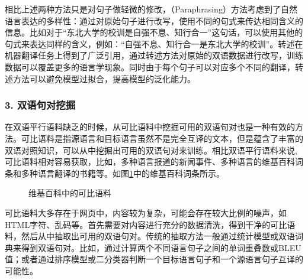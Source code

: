 \parinterval 相比上述两种方法只是对句子做轻微的修改，{\small{}}（Paraphrasing）方法考虑到了自然语言表达的多样性：通过对原始句子进行改写，使用不同的句式来传达相同含义的信息。比如对于“东北大学的校训是自强不息、知行合一”这句话，可以使用其他的句式来表达同样的含义，例如：“自强不息、知行合一是东北大学的校训”。转述在机器翻译任务上得到了广泛引用，通过转述方法对原始的双语数据进行改写，训练数据可以覆盖更多的语言学现象。同时由于每个句子可以对应多个不同的翻译，转述方法可以避免模型过拟合，提高模型的泛化能力。

\subsubsection{3. 双语句对挖掘}

\parinterval 在双语平行语料缺乏的时候，从可比语料中挖掘可用的双语句对也是一种有效的方法。可比语料是指源语言和目标语言虽然不是完全互译的文本，但是蕴含了丰富的双语对照知识，可以从中挖掘出可用的双语句对来训练。相比双语平行语料来说,可比语料相对容易获取，比如，多种语言报道的新闻事件、多种语言的维基百科词条和多种语言翻译的书籍等。如图\ref{fig:16-4}中的维基百科词条所示。

\begin{figure}[htp]
    \centering
    
    \caption{维基百科中的可比语料}
    \label{fig:16-4}
\end{figure}

\parinterval 可比语料大多存在于网页中，内容较为复杂，可能会存在较大比例的噪声，如HTML字符、乱码等。首先需要对内容进行充分的数据清洗，得到干净的可比语料，然后从中抽取出可用的双语句对。传统的抽取方法一般通过统计模型或双语词典来得到双语句对。比如，通过计算两个不同语言句子之间的单词重叠数或BLEU值；或者通过排序模型或二分类器判断一个目标语言句子和一个源语言句子互译的可能性。

